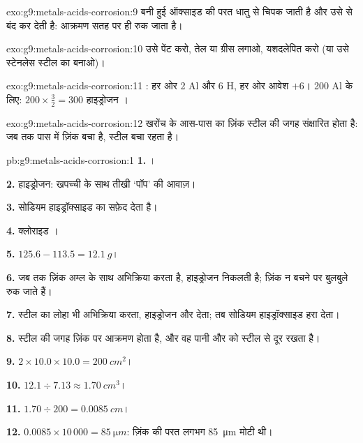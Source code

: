 \begin{solution}{exo:g9:metals-acids-corrosion:9}
बनी हुई ऑक्साइड की परत धातु से चिपक जाती है और उसे  से बंद कर देती है:
आक्रमण सतह पर ही रुक जाता है।
\end{solution}

\begin{solution}{exo:g9:metals-acids-corrosion:10}
उसे पेंट करो, तेल या ग्रीस लगाओ, यशदलेपित करो (या उसे स्टेनलेस स्टील का बनाओ)।
\end{solution}

\begin{solution}{exo:g9:metals-acids-corrosion:11}
: हर ओर 2 Al और 6 H,
हर ओर आवेश $+6$। 200 Al  के लिए: $200 \times \frac{3}{2} = 300$
हाइड्रोजन ।
\end{solution}

\begin{solution}{exo:g9:metals-acids-corrosion:12}
खरोंच के आस-पास का ज़िंक स्टील की जगह संक्षारित होता है: जब तक पास में ज़िंक
बचा है, स्टील बचा रहता है।
\end{solution}

\begin{solution}{pb:g9:metals-acids-corrosion:1}
\textbf{1.} ।

\textbf{2.} हाइड्रोजन:  खपच्ची के साथ तीखी `पॉप' की आवाज़।

\textbf{3.} सोडियम हाइड्रॉक्साइड  का सफ़ेद
 देता है।

\textbf{4.} क्लोराइड  ।

\textbf{5.} $125.6 - 113.5 = \qty{12.1}{g}$।

\textbf{6.} जब तक ज़िंक अम्ल के साथ अभिक्रिया करता है, हाइड्रोजन निकलती है;
ज़िंक न बचने पर बुलबुले रुक जाते हैं।

\textbf{7.} स्टील का लोहा भी अभिक्रिया करता, हाइड्रोजन और
  देता; तब सोडियम हाइड्रॉक्साइड हरा  देता।

\textbf{8.} स्टील की जगह ज़िंक पर आक्रमण होता है, और वह पानी और  को स्टील
से दूर रखता है।

\textbf{9.} $2 \times 10.0 \times 10.0 = \qty{200}{cm^2}$।

\textbf{10.} $12.1 \div 7.13 \approx \qty{1.70}{cm^3}$।

\textbf{11.} $1.70 \div 200 = \qty{0.0085}{cm}$।

\textbf{12.} $0.0085 \times 10\,000 = \qty{85}{\micro m}$: ज़िंक की
परत लगभग \qty{85}{\micro m} मोटी थी।
\end{solution}
